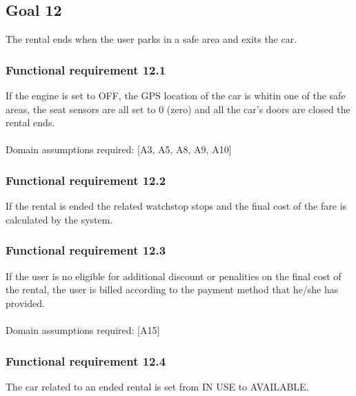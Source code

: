 \subsection{Goal 12}
The rental ends when the user parks in a safe area and exits the car.

\setcounter{secnumdepth}{3}
\subsubsection{Functional requirement 12.1}
If the engine is set to OFF, the GPS location of the car is whitin one of the safe areas, the seat sensors are all set to 0 (zero) and all the car's doors are closed the rental ends.\\~\\
\noindent Domain assumptions required: [A3, A5, A8, A9, A10]

\subsubsection{Functional requirement 12.2}
If the rental is ended the related watchstop stops and the final cost of the fare is calculated by the system.

\subsubsection{Functional requirement 12.3}
If the user is no eligible for additional discount or penalities on the final cost of the rental, the user is billed according to the payment method that he/she has provided.\\~\\
\noindent Domain assumptions required: [A15]

\subsubsection{Functional requirement 12.4}
The car related to an ended rental is set from IN USE to AVAILABLE.
